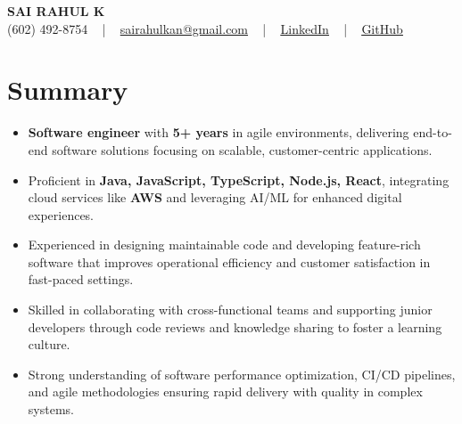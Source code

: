 \documentclass[letterpaper,11pt]{article}
\newcommand{\resumeItem}[1]{
  \item\footnotesize{
    {#1 \vspace{-2pt}}
  }
}
\newcommand{\resumeItemListStart}{\begin{itemize}[leftmargin=*]}
\newcommand{\resumeItemListEnd}{\end{itemize}\vspace{-5pt}}
\begin{document}
\begin{center}
    {\fontsize{14pt}{12pt}\selectfont \textbf{\MakeUppercase{Sai Rahul K}}}\\ \vspace{2pt}
    \fontsize{10pt}{12pt}\selectfont (602) 492-8754 ~ | ~ \href{mailto:sairahulkan@gmail.com}{sairahulkan@gmail.com} ~ | ~
    \href{https://www.linkedin.com/in/rq123/}{\color{blue}\underline{LinkedIn}} ~ | ~
    \href{https://github.com/kanrahuldo}{\color{blue}\underline{GitHub}}~
    \vspace{-8pt}
\end{center}

\section{Summary}
\fontsize{9pt}{10pt}\selectfont
\resumeItemListStart
    \resumeItem{\textbf{Software engineer} with \textbf{5+ years} in agile environments, delivering end-to-end software solutions focusing on scalable, customer-centric applications.} \vspace{-3pt}
    \resumeItem{Proficient in \textbf{Java, JavaScript, TypeScript, Node.js, React}, integrating cloud services like \textbf{AWS} and leveraging AI/ML for enhanced digital experiences.} \vspace{-3pt}
    \resumeItem{Experienced in designing maintainable code and developing feature-rich software that improves operational efficiency and customer satisfaction in fast-paced settings.} \vspace{-3pt}
    \resumeItem{Skilled in collaborating with cross-functional teams and supporting junior developers through code reviews and knowledge sharing to foster a learning culture.} \vspace{-3pt}
    \resumeItem{Strong understanding of software performance optimization, CI/CD pipelines, and agile methodologies ensuring rapid delivery with quality in complex systems.} \vspace{-3pt}
\resumeItemListEnd
\vspace{-6pt}
\end{document}
